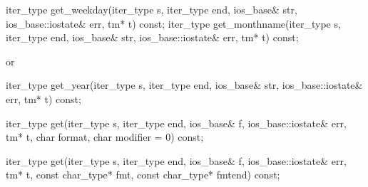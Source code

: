 %
%
%
%
\begin{itemdecl}
iter_type get_weekday(iter_type s, iter_type end, ios_base& str,
                      ios_base::iostate& err, tm* t) const;
iter_type get_monthname(iter_type s, iter_type end, ios_base& str,
                        ios_base::iostate& err, tm* t) const;
\end{itemdecl}

\begin{itemdescr}
\pnum
\returns
{}
or
\end{itemdescr}

%
%
\begin{itemdecl}
iter_type get_year(iter_type s, iter_type end, ios_base& str,
                   ios_base::iostate& err, tm* t) const;
\end{itemdecl}

\begin{itemdescr}
\pnum
\returns
{}
\end{itemdescr}

%
%
\begin{itemdecl}
iter_type get(iter_type s, iter_type end, ios_base& f,
    ios_base::iostate& err, tm* t, char format, char modifier = 0) const;
\end{itemdecl}

\begin{itemdescr}
\pnum
\returns {}
\end{itemdescr}

%
%
\begin{itemdecl}
iter_type get(iter_type s, iter_type end, ios_base& f,
    ios_base::iostate& err, tm* t, const char_type* fmt, const char_type* fmtend) const;
\end{itemdecl}

